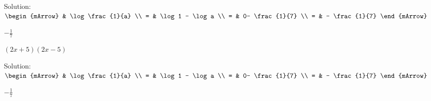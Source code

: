 \begin{enumerate}[resume]
\begin{subtask}
\begin{exercise}
\begin{envSolution}
			            Solution:\\[0.5cm]
                        \-\hspace{1.5cm} $\begin{mArrow}
                                  &  \log \frac{1}{a}                   \\
							    = &  \log 1 - \log a                   \\
     						    = & 0- \frac{1}{7}                     \\ 
             					= & - \frac{1}{7}			
						  \end{mArrow}$			   
                        \begin{shortsolution}  
				           $  -\frac{1}{7} $
			            \end{shortsolution}				 
                    \end{envSolution}
               \end{exercise}
           \task[] $ (2x+5)(2x-5)    	 $  
	          \begin{exercise} 
                   \begin{envSolution}
			            Solution:\\[0.5cm]
                        \-\hspace{1.5cm} $\begin{mArrow}
                                  &  \log \frac{1}{a}                   \\
							    = &  \log 1 - \log a                   \\
     						    = & 0- \frac{1}{7}                     \\ 
             					= & - \frac{1}{7}			
						  \end{mArrow}$			   
                        \begin{shortsolution}  
				           $  -\frac{1}{7} $
			            \end{shortsolution}				 
                    \end{envSolution}
               \end{exercise}
		\end{subtask}	   
\end{enumerate}


